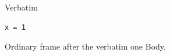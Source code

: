 \documentclass{beamer}
\begin{document}
\begin{frame}[containsverbatim]{Verbatim}
\begin{lstlisting}
x = 1
\end{lstlisting}
\end{frame}

\begin{frame}{Ordinary frame after the verbatim one}
Body.
\end{frame}
\end{document}

